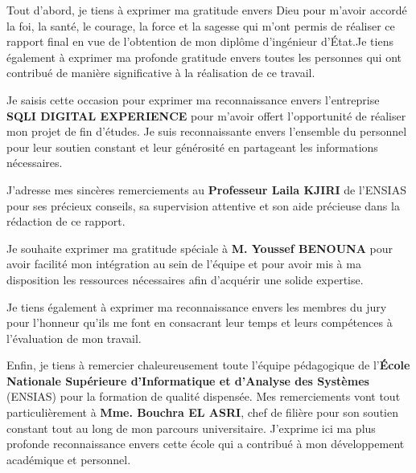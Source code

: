 
Tout d'abord, je tiens à exprimer ma gratitude envers Dieu pour m'avoir accordé la foi, la santé, le courage, la force et la sagesse qui m'ont permis de réaliser ce rapport final en vue de l'obtention de mon diplôme d'ingénieur d'État.Je tiens également à exprimer ma profonde gratitude envers toutes les personnes qui ont contribué de manière significative à la réalisation de ce travail.

Je saisis cette occasion pour exprimer ma reconnaissance envers l'entreprise \textbf{SQLI DIGITAL EXPERIENCE} pour m'avoir offert l'opportunité de réaliser mon projet de fin d'études. Je suis reconnaissante envers l'ensemble du personnel pour leur soutien constant et leur générosité en partageant les informations nécessaires.

J'adresse mes sincères remerciements au \textbf{Professeur Laila KJIRI} de l'ENSIAS pour ses précieux conseils, sa supervision attentive et son aide précieuse dans la rédaction de ce rapport.

Je souhaite exprimer ma gratitude spéciale à \textbf{M. Youssef BENOUNA} pour avoir facilité mon intégration au sein de l'équipe et pour avoir mis à ma disposition les ressources nécessaires afin d'acquérir une solide expertise.

Je tiens également à exprimer ma reconnaissance envers les membres du jury pour l'honneur qu'ils me font en consacrant leur temps et leurs compétences à l'évaluation de mon travail.

Enfin, je tiens à remercier chaleureusement toute l'équipe pédagogique de l'\textbf{École Nationale Supérieure d'Informatique et d'Analyse des Systèmes} (ENSIAS) pour la formation de qualité dispensée. Mes remerciements vont tout particulièrement à \textbf{Mme. Bouchra EL ASRI}, chef de filière pour son soutien constant tout au long de mon parcours universitaire. J'exprime ici ma plus profonde reconnaissance envers cette école qui a contribué à mon développement académique et personnel.


\clearpage